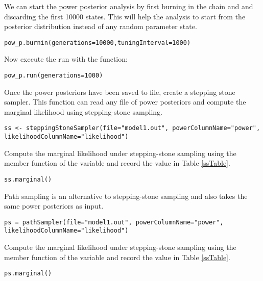 We can start the power posterior analysis by first burning in the chain and and discarding the first 10000 states.  
This will help the analysis to start from the posterior distribution instead of any random parameter state.
{\tt \begin{snugshade*}
\begin{lstlisting}
pow_p.burnin(generations=10000,tuningInterval=1000)
\end{lstlisting}
\end{snugshade*}}

Now execute the run with the  function:
{\tt \begin{snugshade*}
\begin{lstlisting}
pow_p.run(generations=1000)  
\end{lstlisting}
\end{snugshade*}}

Once the power posteriors have been saved to file, create a stepping stone sampler. 
This function can read any file of power posteriors and compute the marginal likelihood using stepping-stone sampling. 
{\tt \small \begin{snugshade*}
\begin{lstlisting}
ss <- steppingStoneSampler(file="model1.out", powerColumnName="power", likelihoodColumnName="likelihood")
\end{lstlisting}
\end{snugshade*}}

Compute the marginal likelihood under stepping-stone sampling using the member function  of the  variable and record the value in Table \ref{ssTable}.
{\tt \begin{snugshade*}
\begin{lstlisting}
ss.marginal() 
\end{lstlisting}
\end{snugshade*}}

Path sampling is an alternative to stepping-stone sampling and also takes the same power posteriors as input. 
{\tt \small \begin{snugshade*}
\begin{lstlisting}
ps = pathSampler(file="model1.out", powerColumnName="power", likelihoodColumnName="likelihood")
\end{lstlisting}
\end{snugshade*}}

Compute the marginal likelihood under stepping-stone sampling using the member function  of the  variable and record the value in Table \ref{ssTable}.
{\tt \begin{snugshade*}
\begin{lstlisting}
ps.marginal() 
\end{lstlisting}
\end{snugshade*}}

